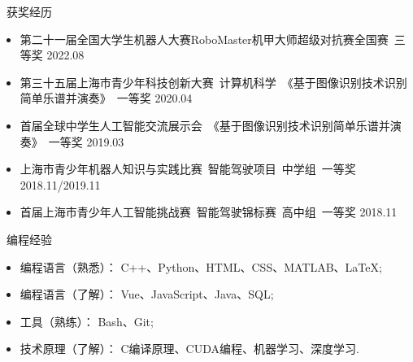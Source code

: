 \documentclass[UTF8]{resume}
\begin{document}
\begin{rSection}{\faAward~获奖经历}
    \begin{itemize}
        \itemsep -0.5em
        \item 第二十一届全国大学生机器人大赛RoboMaster机甲大师超级对抗赛全国赛~三等奖 \hfill 2022.08
        \item 第三十五届上海市青少年科技创新大赛~计算机科学~《基于图像识别技术识别简单乐谱并演奏》~一等奖 \hfill 2020.04
        \item 首届全球中学生人工智能交流展示会~《基于图像识别技术识别简单乐谱并演奏》~一等奖 \hfill 2019.03
        \item 上海市青少年机器人知识与实践比赛~智能驾驶项目~中学组~一等奖 \hfill 2018.11/2019.11
        \item 首届上海市青少年人工智能挑战赛~智能驾驶锦标赛~高中组~一等奖 \hfill 2018.11
    \end{itemize}
\end{rSection}


\begin{rSection}{\faCogs~编程经验}
  \begin{itemize}
      \itemsep -0.5em
      \item 编程语言（熟悉）： C++、Python、HTML、CSS、MATLAB、\LaTeX; 
      \item 编程语言（了解）： Vue、JavaScript、Java、SQL;
      \item 工具（熟练）： Bash、Git; 
      \item 技术原理（了解）： C编译原理、CUDA编程、机器学习、深度学习.
  \end{itemize} 
\end{rSection}
\end{document}
